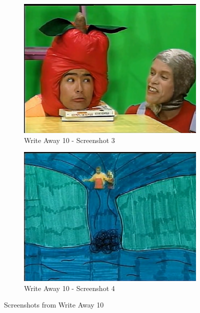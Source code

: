 \begin{figure}[H]
    \begin{subfigure}{0.45\textwidth}
        \centering
        \includegraphics[width=\linewidth]{Games/WriteAway/Images/WriteAway10Screenshot3.png}
        \caption{Write Away 10 - Screenshot 3}
        \label{fig:sub3}
    \end{subfigure}
    \begin{subfigure}{0.45\textwidth}
        \centering
        \includegraphics[width=\linewidth]{Games/WriteAway/Images/WriteAway10Screenshot4.png}
        \caption{Write Away 10 - Screenshot 4}
        \label{fig:sub4}
    \end{subfigure}
    \caption{Screenshots from Write Away 10}
    \label{fig:all}
\end{figure}
